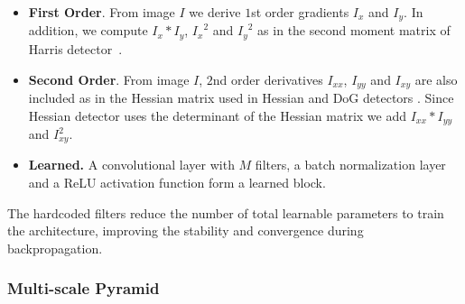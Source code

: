 \begin{itemize}
	\item \textbf{First Order}. From image $I$ we derive $1$st order gradients $I_x$ and $I_y$. In addition, we compute $I_x*I_y$, ${I_x}^2$ and ${I_y}^2$ as in the second moment matrix of Harris detector~\cite{Harris}.
    \item \textbf{Second Order}. From image $I$, $2$nd order derivatives $I_{xx}$, $I_{yy}$ and $I_{xy}$ are also included as in the Hessian matrix used in Hessian and DoG detectors \cite{HarrisLaplace,SIFT}.  Since Hessian detector uses the determinant of the Hessian matrix we add  $I_{xx}*I_{yy}$ and $I_{xy}^2$. 
     \item \textbf{Learned.}  A convolutional layer with $M$ filters, a batch normalization layer and a ReLU activation function form a learned block.

\end{itemize}
The hardcoded filters reduce the number of total learnable parameters to train the architecture, improving the stability and convergence during backpropagation.
% 




\subsubsection{Multi-scale Pyramid }
\label{sec:pyramid}

